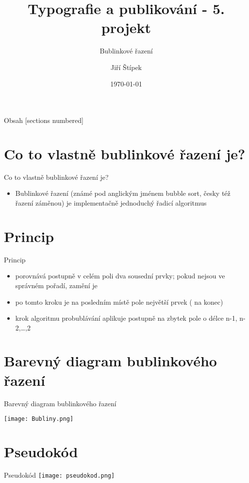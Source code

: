\documentclass{beamer}
\title{Typografie a publikování - 5. projekt}
\subtitle{Bublinkové řazení}
\author{Jiří Štípek}
\institute
{
	Vysoké učení technické v~Brně\\
	Fakulta informačních technologií
}
\date{\today}
\begin{document}
\frame{\titlepage}
\begin{frame}{Obsah}
    [sections numbered]
    \tableofcontents[hideallsubsections]
\end{frame}
\section{Co to vlastně bublinkové řazení je?}
\begin{frame}{Co to vlastně bublinkové řazení je?}
\begin{itemize}
    \item Bublinkové řazení (známé pod anglickým jménem bubble sort, česky též řazení záměnou) je implementačně jednoduchý řadicí algoritmus
\end{itemize}
    
\end{frame}
\section{Princip}
\begin{frame}{Princip}
    \begin{itemize}
        \item porovnává postupně v celém poli dva sousední prvky; pokud nejsou ve správném pořadí, zamění je
        \item po tomto kroku je na posledním místě pole největší prvek ( na konec)
        \item krok algoritmu probublávání aplikuje postupně na zbytek pole o délce n-1, n-2,…,2
       
    \end{itemize}
\end{frame}
\section{Barevný diagram bublinkového řazení}
\begin{frame}{Barevný diagram bublinkového řazení}
\begin{center}
    \scalebox{0.17}
    {
    \texttt{[image: Bubliny.png]}
    }
\end{center}
\end{frame}
\section{Pseudokód}
\begin{frame}{Pseudokód}
    \texttt{[image: pseudokod.png]}
\end{frame}
\end{document}
